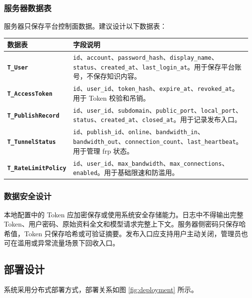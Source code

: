 \documentclass[UTF8,a4paper,12pt,fontset=fandol]{ctexart}
\newcommand{\code}[1]{\texttt{\footnotesize #1}}
\begin{document}
\subsubsection{服务器数据表}
服务器只保存平台控制面数据。建议设计以下数据表：

\begin{longtable}{>{\bfseries}p{3.2cm}p{11.0cm}}
\toprule
数据表 & 字段说明 \\
\midrule
\code{T\_User} & \code{id}、\code{account}、\code{password\_hash}、\code{display\_name}、\code{status}、\code{created\_at}、\code{last\_login\_at}。用于保存平台账号，不保存知识内容。 \\
\code{T\_AccessToken} & \code{id}、\code{user\_id}、\code{token\_hash}、\code{expire\_at}、\code{revoked\_at}。用于 Token 校验和吊销。 \\
\code{T\_PublishRecord} & \code{id}、\code{user\_id}、\code{subdomain}、\code{public\_port}、\code{local\_port}、\code{status}、\code{created\_at}、\code{closed\_at}。用于记录发布入口。 \\
\code{T\_TunnelStatus} & \code{id}、\code{publish\_id}、\code{online}、\code{bandwidth\_in}、\code{bandwidth\_out}、\code{connection\_count}、\code{last\_heartbeat}。用于管理 frp 状态。 \\
\code{T\_RateLimitPolicy} & \code{id}、\code{user\_id}、\code{max\_bandwidth}、\code{max\_connections}、\code{enabled}。用于基础限速和防滥用。 \\
\bottomrule
\end{longtable}

\subsubsection{数据安全设计}
本地配置中的 Token 应加密保存或使用系统安全存储能力。日志中不得输出完整 Token、用户密码、原始资料全文和模型请求完整上下文。服务器侧密码只保存哈希值，Token 只保存哈希或可验证摘要。发布入口应支持用户主动关闭，管理员也可在滥用或异常流量场景下回收入口。

\subsection{部署设计}
系统采用分布式部署方式，部署关系如图 \ref{fig:deployment} 所示。
\end{document}

